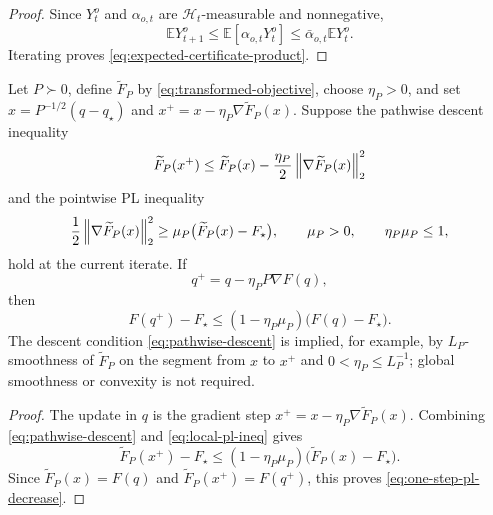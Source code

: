 \begin{proof}
Since $Y_t^o$ and $\alpha_{o,t}$ are $\mathcal{H}_t$-measurable and nonnegative,
\begin{equation}
    \mathbb{E}Y_{t+1}^o
    \leq
    \mathbb{E}\left[\alpha_{o,t}Y_t^o\right]
    \leq
    \bar\alpha_{o,t}\mathbb{E}Y_t^o .
\end{equation}
Iterating proves \eqref{eq:expected-certificate-product}.
\end{proof}

\begin{lemma}
\label{lem:one-step-pl-decrease}
Let $P\succ0$, define $\widetilde F_P$ by \eqref{eq:transformed-objective}, choose
$\eta_P>0$, and set $x=P^{-1/2}(q-q_\star)$ and
$x^+=x-\eta_P\nabla\widetilde F_P(x)$.  Suppose the pathwise descent inequality
\begin{equation}
    \widetilde F_P(x^+)
    \leq
    \widetilde F_P(x)-\frac{\eta_P}{2}\left\lVert \nabla\widetilde F_P(x) \right\rVert_2^2
    \label{eq:pathwise-descent}
\end{equation}
and the pointwise PL inequality
\begin{equation}
    \frac{1}{2}\left\lVert \nabla\widetilde F_P(x) \right\rVert_2^2
    \geq
    \mu_P\bigl(\widetilde F_P(x)-F_\star\bigr),
    \qquad \mu_P>0,
    \qquad \eta_P\mu_P\leq1,
    \label{eq:local-pl-ineq}
\end{equation}
hold at the current iterate.  If
\begin{equation}
    q^+=q-\eta_PP\nabla F(q),
\end{equation}
then
\begin{equation}
    F(q^+)-F_\star
    \leq
    \left(1-\eta_P\mu_P\right)\bigl(F(q)-F_\star\bigr).
    \label{eq:one-step-pl-decrease}
\end{equation}
The descent condition \eqref{eq:pathwise-descent} is implied, for example, by
$L_P$-smoothness of $\widetilde F_P$ on the segment from $x$ to $x^+$ and
$0<\eta_P\leq L_P^{-1}$; global smoothness or convexity is not required.
\end{lemma}

\begin{proof}
The update in $q$ is the gradient step
$x^+=x-\eta_P\nabla\widetilde F_P(x)$.  Combining \eqref{eq:pathwise-descent} and
\eqref{eq:local-pl-ineq} gives
\begin{equation}
    \widetilde F_P(x^+)-F_\star
    \leq
    \left(1-\eta_P\mu_P\right)
    \bigl(\widetilde F_P(x)-F_\star\bigr).
\end{equation}
Since $\widetilde F_P(x)=F(q)$ and $\widetilde F_P(x^+)=F(q^+)$, this proves
\eqref{eq:one-step-pl-decrease}.
\end{proof}

